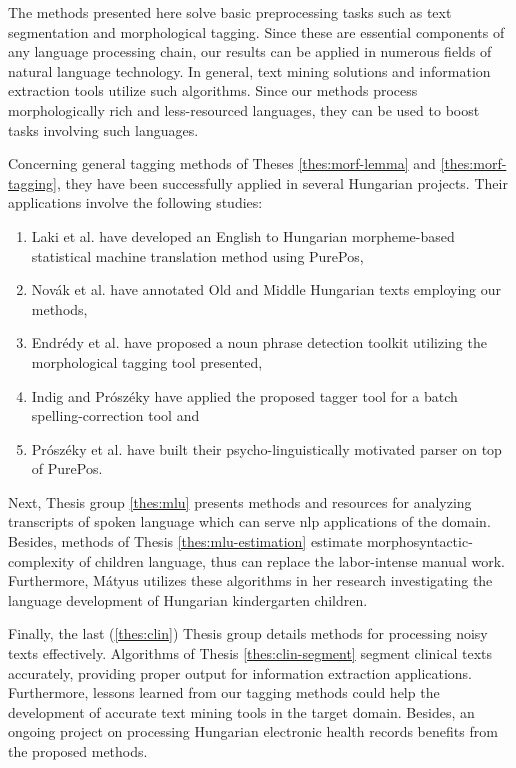 
The methods presented here solve basic preprocessing tasks such as text segmentation and morphological tagging. 
Since these are essential components of any language processing chain, our results can be applied in numerous fields of natural language technology. 
In general, text mining solutions and information extraction tools utilize such algorithms.
Since our methods process morphologically rich and less-resourced languages, they can be used to boost tasks involving such languages.

Concerning general tagging methods of Theses \ref{thes:morf-lemma} and \ref{thes:morf-tagging}, they have been successfully applied in several Hungarian projects.
Their applications involve the following studies:
\begin{enumerate}
\item Laki et al. \cite{Laki2013} have developed an English to Hungarian morpheme-based statistical machine translation method using PurePos,
\item Novák et al. \cite{Novak2013} have annotated Old and Middle Hungarian texts employing our methods,
\item Endrédy et al. \cite{Endredy2014} have proposed a noun phrase detection toolkit utilizing the morphological tagging tool presented,
\item Indig and Prószéky have applied \cite{Indig2013} the proposed tagger tool for a batch spelling-correction tool and
\item Prószéky et al. \cite{Proszeky2014} have built their psycho-linguistically motivated parser on top of PurePos.
\end{enumerate}

Next, Thesis group \ref{thes:mlu} presents methods and resources for analyzing transcripts of spoken language which can serve \acrshort{nlp} applications of the domain.
Besides, methods of Thesis \ref{thes:mlu-estimation} estimate morphosyntactic-complexity of children language, thus can replace the labor-intense manual work.
Furthermore, Mátyus utilizes \cite{Matyus2014b} these algorithms in her research investigating the language development of Hungarian kindergarten children.

Finally, the last (\ref{thes:clin}) Thesis group details methods for processing noisy texts effectively.
Algorithms of Thesis \ref{thes:clin-segment} segment clinical texts accurately, providing proper output for information extraction applications. 
Furthermore, lessons learned from our tagging methods could help the development of accurate text mining tools in the target domain.
Besides, an ongoing project \cite{Siklosi2014,Siklosi2014mszny,Orosz2014x} on processing Hungarian electronic health records benefits from the proposed methods.


